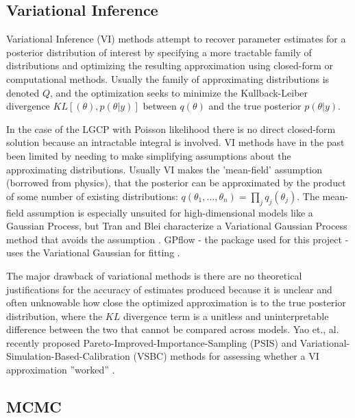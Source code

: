 \subsection{Variational Inference}

Variational Inference (VI) methods attempt to recover parameter estimates for a posterior distribution of interest by specifying a more tractable family of distributions and optimizing the resulting approximation using closed-form or computational methods. Usually the family of approximating distributions is denoted $Q$, and the optimization seeks to minimize the Kullback-Leiber divergence $KL[(\theta), p(\theta|y)]$ between $q(\theta)$ and the true posterior $p(\theta|y)$. \par

In the case of the LGCP with Poisson likelihood there is no direct closed-form solution because an intractable integral is involved. VI methods have in the past been limited by needing to make simplifying assumptions about the approximating distributions. Usually VI makes the 'mean-field' assumption (borrowed from physics), that the posterior can be approximated by the product of some number of existing distributions: $q(\theta_1,...,\theta_n)= \prod_j{q_j(\theta_j)}$. The mean-field assumption is especially unsuited for high-dimensional models like a Gaussian Process, but Tran and Blei characterize a Variational Gaussian Process method that avoids the assumption \cite{tran_2015}. GPflow - the package used for this project - uses the Variational Gaussian  for fitting \cite{GPflow2017}.\par

The major drawback of variational methods is there are no theoretical justifications for the accuracy of estimates produced because it is unclear and often unknowable how close the optimized approximation is to the true posterior distribution, where the $KL$ divergence term is a unitless and uninterpretable difference between the two that cannot be compared across models. Yao et., al. recently proposed Pareto-Improved-Importance-Sampling (PSIS) and Variational-Simulation-Based-Calibration (VSBC) methods for assessing whether a VI approximation ''worked'' \cite{yao_2018}.

\subsection{MCMC}

